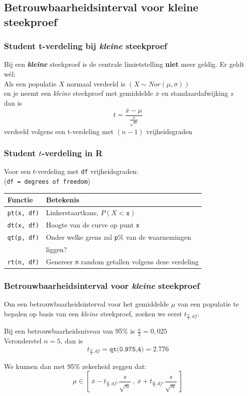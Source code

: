 \documentclass{beamer}
\begin{document}
\subsection{Betrouwbaarheidsinterval voor kleine steekproef}
\begin{frame}
  \frametitle{Student t-verdeling bij \textit{kleine} steekproef}
  Bij een \textit{\textbf{kleine}} steekproef is de centrale limietstelling \textbf{niet} meer geldig.
  \vfill
  Er geldt wél:\\
  \vfill
  Als een populatie $X$ normaal verdeeld is $(X \sim Nor(\mu,\sigma))$\\
  en je neemt een \textit{kleine} steekproef met gemiddelde $\overline{x}$ en standaardafwijking $s$\\
  dan is
\[ t = \frac{\overline{x} - \mu}{\frac{s}{\sqrt{n}}} \]
verdeeld volgens een t-verdeling met $(n-1)$ vrijheidsgraden

\end{frame}



\begin{frame}[fragile]
\frametitle{Student $t$-verdeling in R}

Voor een $t$-verdeling met \texttt{df} vrijheidsgraden:\\
\small (\texttt{df = degrees of freedom})
\vfill
\centering
\begin{tabular}{ll}
	\textbf{Functie} & \textbf{Betekenis}                                         \\ \hline
	\verb|pt(x, df)| & Linkerstaartkans, $P(X<\mathtt{x})$                        \\
	\verb|dt(x, df)| & Hoogte van de curve op punt \texttt{x}                     \\
	\verb|qt(p, df)| & Onder welke grens zal \texttt{p}\% van de waarnemingen     \\
	                 & liggen?                                                    \\
	\verb|rt(n, df)| & Genereer \texttt{n} random getallen volgens deze verdeling
\end{tabular}

\end{frame}

\begin{frame}
\frametitle{Betrouwbaarheidsinterval voor \textit{kleine} steekproef}
Om een betrouwbaarheidsinterval voor het gemiddelde $\mu$ van een populatie te bepalen op basis van een \textit{kleine} steekproef, zoeken we eerst $t_ {\frac{\alpha}{2},df}$.

\vfill
Bij een betrouwbaarheidsniveau van 95\% is $\frac{\alpha}{2}=0,025$\\
Veronderstel $n=5$, dan is
\[ t_ {\frac{\alpha}{2},df} = \texttt{qt(0.975,4)} = 2.776 \]

\vfill
We kunnen dan met 95\% zekerheid zeggen dat:
\[ \mu \in \left[~ \overline{x} - t_{\frac{\alpha}{2},df}.\frac{s}{\sqrt{n}} ~,~ \overline{x} + t_{\frac{\alpha}{2},df}.\frac{s}{\sqrt{n}} ~\right] \]

\end{frame}
\end{document}
